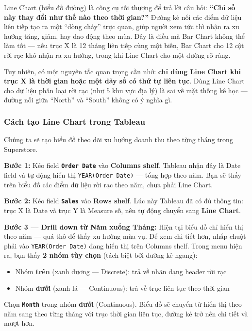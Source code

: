 \documentclass[12pt]{article}
\begin{document}
\noindent Line Chart (biểu đồ đường) là công cụ tối thượng để trả lời câu hỏi: \textbf{``Chỉ số này thay đổi như thế nào theo thời gian?''} Đường kẻ nối các điểm dữ liệu liên tiếp tạo ra một ``dòng chảy'' trực quan, giúp người xem tức thì nhận ra xu hướng tăng, giảm, hay dao động theo mùa. Đây là điều mà Bar Chart không thể làm tốt --- nếu trục X là 12 tháng liên tiếp cùng một biến, Bar Chart cho 12 cột rời rạc khó nhận ra xu hướng, trong khi Line Chart cho một đường rõ ràng.

\noindent Tuy nhiên, có một nguyên tắc quan trọng cần nhớ: \textbf{chỉ dùng Line Chart khi trục X là thời gian hoặc một dãy số có thứ tự liên tục}. Dùng Line Chart cho dữ liệu phân loại rời rạc (như 5 khu vực địa lý) là sai về mặt thống kê học --- đường nối giữa ``North'' và ``South'' không có ý nghĩa gì.

\subsubsection{Cách tạo Line Chart trong Tableau}

\noindent Chúng ta sẽ tạo biểu đồ theo dõi xu hướng doanh thu theo từng tháng trong Superstore.

\noindent \textbf{Bước 1:} Kéo field \textbf{\texttt{Order Date}} vào \textbf{Columns shelf}. Tableau nhận đây là Date field và tự động hiển thị \texttt{YEAR(Order Date)} --- tổng hợp theo năm. Bạn sẽ thấy trên biểu đồ các điểm dữ liệu rời rạc theo năm, chưa phải Line Chart.

\noindent \textbf{Bước 2:} Kéo field \textbf{\texttt{Sales}} vào \textbf{Rows shelf}. Lúc này Tableau đã có đủ thông tin: trục X là Date và trục Y là Measure số, nên tự động chuyển sang \textbf{Line Chart}.

\noindent \textbf{Bước 3 --- Drill down từ Năm xuống Tháng:} Hiện tại biểu đồ chỉ hiển thị theo năm --- quá thô để thấy xu hướng mùa vụ. Để xem chi tiết hơn, nhấp chuột phải vào \texttt{YEAR(Order Date)} đang hiển thị trên Columns shelf. Trong menu hiện ra, bạn thấy \textbf{2 nhóm tùy chọn} (tách biệt bởi đường kẻ ngang):
\begin{itemize}[nosep]
    \item Nhóm \textbf{trên} (xanh dương --- Discrete): trả về nhãn dạng header rời rạc
    \item Nhóm \textbf{dưới} (xanh lá --- Continuous): trả về trục liên tục theo thời gian
\end{itemize}

\noindent Chọn \textbf{\texttt{Month}} trong nhóm \textbf{dưới} (Continuous). Biểu đồ sẽ chuyển từ hiển thị theo năm sang theo từng tháng với trục thời gian liên tục, đường kẻ trở nên chi tiết và mượt hơn.
\end{document}
